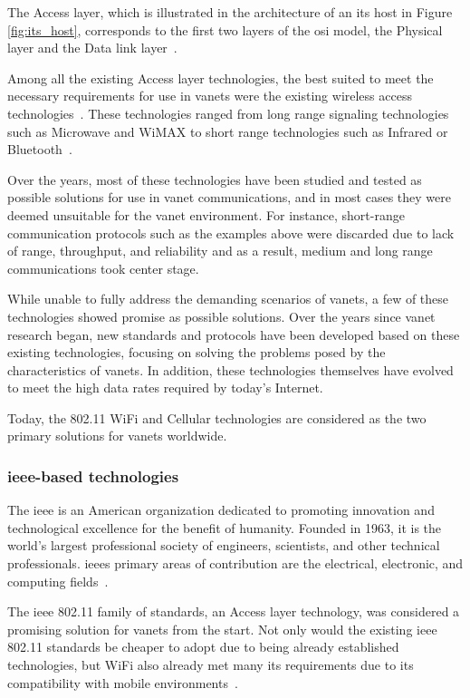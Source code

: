 The Access layer, which is illustrated in the architecture of an \gls{its} host in Figure \ref{fig:its_host}, corresponds to the first two layers of the \gls{osi} model, the Physical layer and the Data link layer~\cite{etsi_intelligent_2020}.

Among all the existing Access layer technologies, the best suited to meet the necessary requirements for use in \glspl{vanet} were the existing wireless access technologies~\cite{al-sultan_comprehensive_2014}. These technologies ranged from long range signaling technologies such as Microwave and WiMAX to short range technologies such as Infrared or Bluetooth~\cite{anwer_survey_2014}.

Over the years, most of these technologies have been studied and tested as possible solutions for use in \gls{vanet} communications, and in most cases they were deemed unsuitable for the \gls{vanet} environment. For instance, short-range communication protocols such as the examples above were discarded due to lack of range, throughput, and reliability and as a result, medium and long range communications took center stage.

While unable to fully address the demanding scenarios of \glspl{vanet}, a few of these technologies showed promise as possible solutions. Over the years since \gls{vanet} research began, new standards and protocols have been developed based on these existing technologies, focusing on solving the problems posed by the characteristics of \glspl{vanet}. In addition, these technologies themselves have evolved to meet the high data rates required by today's Internet.

Today, the  802.11 WiFi and Cellular technologies are considered as the two primary solutions for \glspl{vanet} worldwide.

\subsubsection[IEEE-based technologies]{\gls{ieee}-based technologies}
The \gls{ieee} is an American organization dedicated to promoting innovation and technological excellence for the benefit of humanity. Founded in 1963, it is the world's largest professional society of engineers, scientists, and other technical professionals. \glspl{ieee} primary areas of contribution are the electrical, electronic, and computing fields~\cite{noauthor_history_nodate}.

The \gls{ieee} 802.11 family of standards, an Access layer technology, was considered a promising solution for \glspl{vanet} from the start. Not only would the existing \gls{ieee} 802.11 standards be cheaper to adopt due to being already established technologies, but WiFi also already met many \gls{its} requirements due to its compatibility with mobile environments~\cite{rohde__schwarz_intelligent_2019}.

